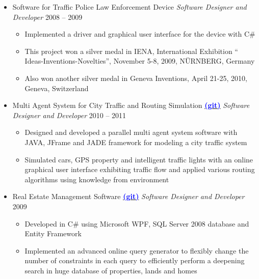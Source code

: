\documentclass[letter]{res}
\begin{document}
\begin{resume}
\begin{itemize}[leftmargin=-.1in]
			\item Software for Traffic Police Law Enforcement Device \newline
			{\sl Software Designer and Developer} \hfill 2008 – 2009\\
			\vspace{-4mm}
			\iflong
			\begin{itemize}
				\item Implemented a driver and graphical user interface for the device with C\#
				\item This project won a silver medal in IENA, International Exhibition `` Ideas-Inventions-Novelties'', November 5-8, 2009, N\"{U}RNBERG, Germany
				\item Also won another silver medal in Geneva Inventions, April 21-25, 2010, Geneva, Switzerland
			\end{itemize}
			\fi
			
			\item Multi Agent System for City Traffic and Routing Simulation {\href{https://github.com/omid55/city_routing_model_jade_mutli_agent_system}{\textbf{\textcolor{blue}{(git)}}}} \newline
			{\sl Software Designer and Developer} \hfill 2010 – 2011\\
			\vspace{-4mm}
			\iflong
			\begin{itemize}
				\item Designed and developed a parallel multi agent system software with JAVA, JFrame and JADE framework for modeling a city traffic system
				\item Simulated cars, GPS property and intelligent traffic lights with an online graphical user interface exhibiting traffic flow and applied various routing algorithms using knowledge from environment
			\end{itemize}
			\fi
			
			\item Real Estate Management Software {\href{https://github.com/omid55/real_state_manager}{\textbf{\textcolor{blue}{(git)}}}}
			\newline
			{\sl Software Designer and Developer} \hfill 2009\\
			\vspace{-4mm}
			\iflong
			\begin{itemize}
				\item Developed in C\# using Microsoft WPF, SQL Server 2008 database and Entity Framework
				\item Implemented an advanced online query generator to flexibly change the number of constraints in each query to efficiently perform a deepening search in huge database of properties, lands and homes
			\end{itemize}
			\fi
			

\end{itemize}
\end{resume}
\end{document}

